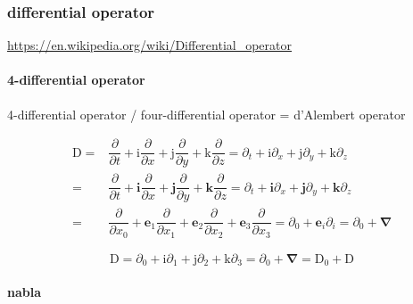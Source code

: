 \documentclass[
]{book}
\theoremstyle{definition}
\theoremstyle{definition}
\theoremstyle{definition}
\theoremstyle{definition}
\theoremstyle{remark}
\begin{document}
\subsubsection{differential operator}\label{differential-operator}

\url{https://en.wikipedia.org/wiki/Differential_operator}

\paragraph{4-differential operator}\label{differential-operator-1}

4-differential operator / four-differential operator = d'Alembert operator

\[
\begin{aligned}
\mathrm{D}= & \dfrac{\partial}{\partial t}+\mathrm{i}\dfrac{\partial}{\partial x}+\mathrm{j}\dfrac{\partial}{\partial y}+\mathrm{k}\dfrac{\partial}{\partial z}=\partial_{{\scriptscriptstyle t}}+\mathrm{i}\partial_{{\scriptscriptstyle x}}+\mathrm{j}\partial_{{\scriptscriptstyle y}}+\mathrm{k}\partial_{z}\\
= & \dfrac{\partial}{\partial t}+\boldsymbol{i}\dfrac{\partial}{\partial x}+\boldsymbol{j}\dfrac{\partial}{\partial y}+\boldsymbol{k}\dfrac{\partial}{\partial z}=\partial_{{\scriptscriptstyle t}}+\boldsymbol{i}\partial_{{\scriptscriptstyle x}}+\boldsymbol{j}\partial_{{\scriptscriptstyle y}}+\boldsymbol{k}\partial_{z}\\
= & \dfrac{\partial}{\partial x_{{\scriptscriptstyle 0}}}+\boldsymbol{e}_{{\scriptscriptstyle 1}}\dfrac{\partial}{\partial x_{{\scriptscriptstyle 1}}}+\boldsymbol{e}_{{\scriptscriptstyle 2}}\dfrac{\partial}{\partial x_{{\scriptscriptstyle 2}}}+\boldsymbol{e}_{{\scriptscriptstyle 3}}\dfrac{\partial}{\partial x_{{\scriptscriptstyle 3}}}=\partial_{{\scriptscriptstyle 0}}+\boldsymbol{e}_{{\scriptscriptstyle i}}\partial_{{\scriptscriptstyle i}}=\partial_{{\scriptscriptstyle 0}}+\boldsymbol{\nabla}
\end{aligned}
\]

\[
\mathrm{D}=\partial_{{\scriptscriptstyle 0}}+\mathrm{i}\partial_{{\scriptscriptstyle 1}}+\mathrm{j}\partial_{{\scriptscriptstyle 2}}+\mathrm{k}\partial_{{\scriptscriptstyle 3}}=\partial_{{\scriptscriptstyle 0}}+\boldsymbol{\nabla}=\mathrm{D}_{{\scriptscriptstyle 0}}+\boldsymbol{\mathrm{D}}
\]

\paragraph{nabla}\label{nabla}
\end{document}
